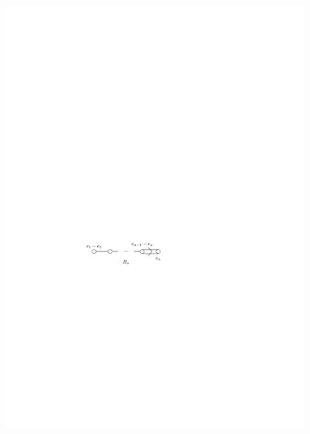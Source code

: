 \begin{itemize}
\begin{itemize}
		\begin{figure}[H]
			\centering
			\includegraphics[scale=1]{figures/Dynkin diagram for Bn.pdf}
		\end{figure}
	\end{itemize}
\end{itemize}

